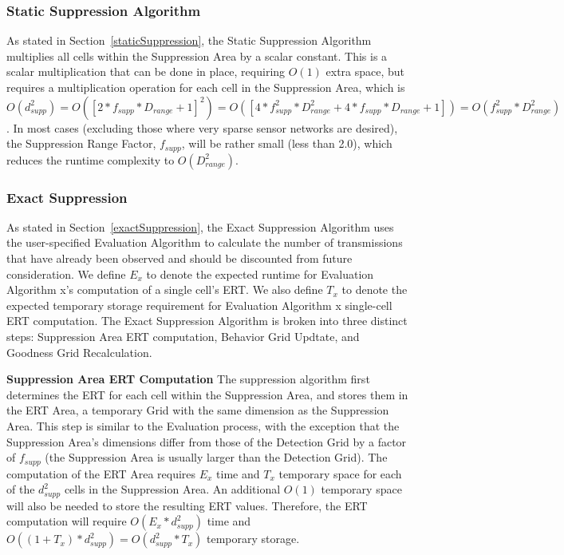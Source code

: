 \subsubsection{Static Suppression Algorithm}
As stated in Section~\ref{staticSuppression}, the Static Suppression Algorithm multiplies all cells within the Suppression Area by a scalar constant.  This is a scalar multiplication that can be done in place, requiring $O(1)$ extra space, but requires a multiplication operation for each cell in the Suppression Area, which is $O(d_{supp} ^2) = O([2*f_{supp}*D_{range} + 1]^2) = O([4*f_{supp}^2*D_{range}^2 + 4*f_{supp}*D_{range} + 1]) = O(f_{supp}^2*D_{range}^2)$.  In most cases (excluding those where very sparse sensor networks are desired), the Suppression Range Factor, $f_{supp}$, will be rather small (less than 2.0), which reduces the runtime complexity to $O(D_{range}^2)$.

\subsubsection{Exact Suppression}
As stated in Section~\ref{exactSuppression}, the Exact Suppression Algorithm uses the user-specified Evaluation Algorithm to calculate the number of transmissions that have already been observed and should be discounted from future consideration.  We define $E_{x}$ to denote the expected runtime for Evaluation Algorithm x's computation of a single cell's ERT.  We also define $T_{x}$ to denote the expected temporary storage requirement for Evaluation Algorithm x single-cell ERT computation.  The Exact Suppression Algorithm is broken into three distinct steps: Suppression Area ERT computation, Behavior Grid Updtate, and Goodness Grid Recalculation.
\newline

\textbf{Suppression Area ERT Computation}\newline
The suppression algorithm first determines the ERT for each cell within the Suppression Area, and stores them in the ERT Area, a temporary Grid with the same dimension as the Suppression Area.  This step is similar to the Evaluation process, with the exception that the Suppression Area's dimensions differ from those of the Detection Grid by a factor of $f_{supp}$ (the Suppression Area is usually larger than the Detection Grid).  The computation of the ERT Area requires $E_{x}$ time and  $T_x$ temporary space for each of the $d_{supp}^2$ cells in the Suppression Area.  An additional  $O(1)$ temporary space will also be needed to store the resulting ERT values.  Therefore, the ERT computation will require $O(E_{x} * d_{supp}^2)$ time and $O((1 + T_x)* d_{supp}^2) = O(d_{supp}^2 * T_x)$ temporary storage.

